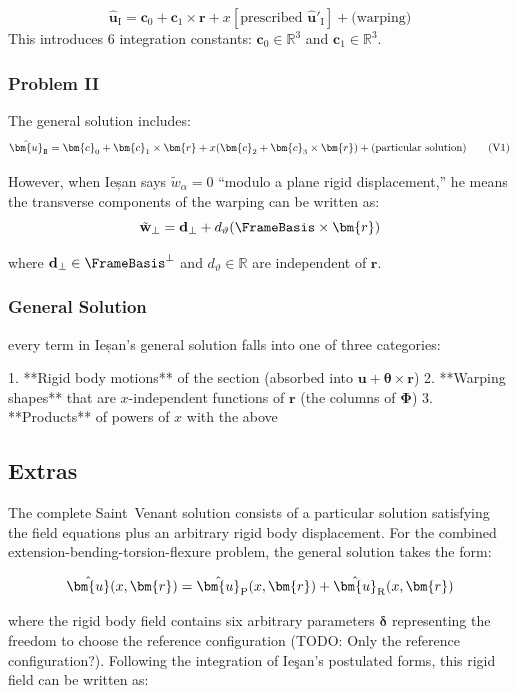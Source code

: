\[
\hat{\bm{u}}_{\text{I}} = \bm{c}_0 + \bm{c}_1 \times \bm{r} + x[\text{prescribed } \hat{\bm{u}}'_{\text{I}}] + \text{(warping)}
\tag{V3}
\]
%
This introduces 6 integration constants:
\(\bm{c}_0 \in \mathbb{R}^3\) and \(\bm{c}_1 \in \mathbb{R}^3\).


\subsubsection{Problem II}
The general solution includes:
\[
\hat{\bm{u}}_{\rm I\!I} = \bm{c}_0 + \bm{c}_1 \times \bm{r} + x(\bm{c}_2 + \bm{c}_3 \times \bm{r}) + \text{(particular solution)}
\tag{V1}
\]

However, when Ieșan says \(\tilde{w}_\alpha = 0\) ``modulo a plane rigid
displacement,'' he means the transverse components of the warping can be
written as:
\[\tilde{\mathbf{w}}_\perp = \mathbf{d}_\perp + d_\vartheta(\FrameBasis \times \bm{r})\]

where \(\mathbf{d}_\perp \in \FrameBasis^\perp\) and
\(d_\vartheta \in \mathbb{R}\) are independent of
\(\bm{r}\).


\subsubsection{General Solution}

every term in Ieșan's general solution falls into one of three categories:

1. **Rigid body motions** of the section (absorbed into $\bm{u} + \bm{\theta} \times \bm{r}$)
2. **Warping shapes** that are $x$-independent functions of $\bm{r}$ (the columns of $\bm{\Phi}$)
3. **Products** of powers of $x$ with the above

\subsection{Extras}
The complete Saint~Venant solution consists of a particular solution satisfying the field equations plus an arbitrary rigid body displacement. 
For the combined extension-bending-torsion-flexure problem, the general solution takes the form:

\begin{equation}
\hat{\bm{u}}(x,\bm{r}) = \hat{\bm{u}}_{\rm P}(x,\bm{r}) + \hat{\bm{u}}_{\rm R}(x,\bm{r})
\end{equation}

where the rigid body field contains six arbitrary parameters \(\bm{\delta}\) representing the freedom to choose the reference configuration (TODO: Only the reference configuration?). 
Following the integration of Ie\c{s}an's postulated forms, this rigid field can be written as:

